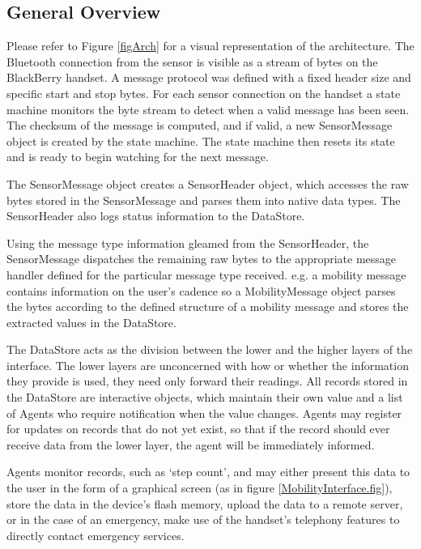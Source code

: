 \documentclass[conference,a4paper]{IEEEtran}
\begin{document}

\subsection{General Overview}

Please refer to Figure \ref{figArch} for a visual representation of the architecture. The Bluetooth connection from the sensor is visible as a stream of bytes on the BlackBerry handset. A message protocol was defined with a fixed header size and specific start and stop bytes. For each sensor connection on the handset a state machine monitors the byte stream to detect when a valid message has been seen. The checksum of the message is computed, and if valid, a new SensorMessage object is created by the state machine. The state machine then resets its state and is ready to begin watching for the next message. 

The SensorMessage object creates a SensorHeader object, which accesses the raw bytes stored in the SensorMessage and parses them into native data types. The SensorHeader also logs status information to the DataStore.

Using the message type information gleamed from the SensorHeader, the SensorMessage dispatches the remaining raw bytes to the appropriate message handler defined for the particular message type received. e.g. a mobility message contains information on the user's cadence so a MobilityMessage object parses the bytes according to the defined structure of a mobility message and stores the extracted values in the DataStore.

The DataStore acts as the division between the lower and the higher layers of the interface. The lower layers are unconcerned with how or whether the information they provide is used, they need only forward their readings. All records stored in the DataStore are interactive objects, which maintain their own value and a list of Agents who require notification when the value changes. Agents may register for updates on records that do not yet exist, so that if the record should ever receive data from the lower layer, the agent will be immediately informed.

Agents monitor records, such as `step count', and may either present this data to the user in the form of a graphical screen (as in figure \ref{MobilityInterface.fig}), store the data in the device's flash memory, upload the data to a remote server, or in the case of an emergency, make use of the handset's telephony features to directly contact emergency services.
\end{document}
